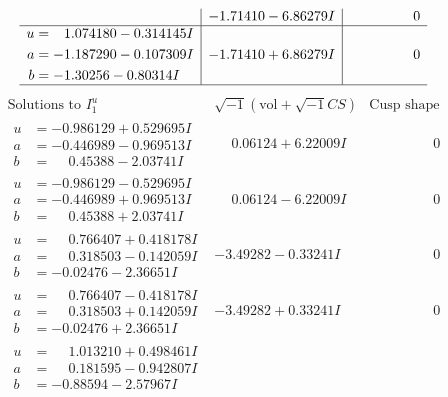 \documentclass[1p]{elsarticle_modified}
\theoremstyle{definition}
\newcommand{\I}{\sqrt{-1}}
\begin{document}
$$\begin{array}{c|c|c}
 & -1.71410 - 6.86279 I & \phantom{-0.000000 } 0 \\ \hline\begin{aligned}
u &= \phantom{-}1.074180 - 0.314145 I \\
a &= -1.187290 - 0.107309 I \\
b &= -1.30256 - 0.80314 I\end{aligned}
 & -1.71410 + 6.86279 I & \phantom{-0.000000 } 0\\
 \hline 
 \end{array}$$\newpage$$\begin{array}{c|c|c}  
\text{Solutions to }I^u_{1}& \I (\text{vol} + \sqrt{-1}CS) & \text{Cusp shape}\\
 \hline 
\begin{aligned}
u &= -0.986129 + 0.529695 I \\
a &= -0.446989 - 0.969513 I \\
b &= \phantom{-}0.45388 - 2.03741 I\end{aligned}
 & \phantom{-}0.06124 + 6.22009 I & \phantom{-0.000000 } 0 \\ \hline\begin{aligned}
u &= -0.986129 - 0.529695 I \\
a &= -0.446989 + 0.969513 I \\
b &= \phantom{-}0.45388 + 2.03741 I\end{aligned}
 & \phantom{-}0.06124 - 6.22009 I & \phantom{-0.000000 } 0 \\ \hline\begin{aligned}
u &= \phantom{-}0.766407 + 0.418178 I \\
a &= \phantom{-}0.318503 - 0.142059 I \\
b &= -0.02476 - 2.36651 I\end{aligned}
 & -3.49282 - 0.33241 I & \phantom{-0.000000 } 0 \\ \hline\begin{aligned}
u &= \phantom{-}0.766407 - 0.418178 I \\
a &= \phantom{-}0.318503 + 0.142059 I \\
b &= -0.02476 + 2.36651 I\end{aligned}
 & -3.49282 + 0.33241 I & \phantom{-0.000000 } 0 \\ \hline\begin{aligned}
u &= \phantom{-}1.013210 + 0.498461 I \\
a &= \phantom{-}0.181595 - 0.942807 I \\
b &= -0.88594 - 2.57967 I\end{aligned}

\end{array}$$
\end{document}

